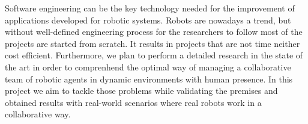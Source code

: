 Software engineering can be the key technology needed for the improvement of applications developed for robotic systems.
Robots are nowadays a trend, but without well-defined engineering process for the researchers to follow most of the projects are started from scratch.
It results in projects that are not time neither cost efficient.
Furthermore, we plan to perform a detailed research in the state of the art in order to comprenhend the optimal way of managing a collaborative team of robotic agents in dynamic environments with human presence.
In this project we aim to tackle those problems while validating the premises and obtained results with real-world scenarios where real robots work in a collaborative way.


